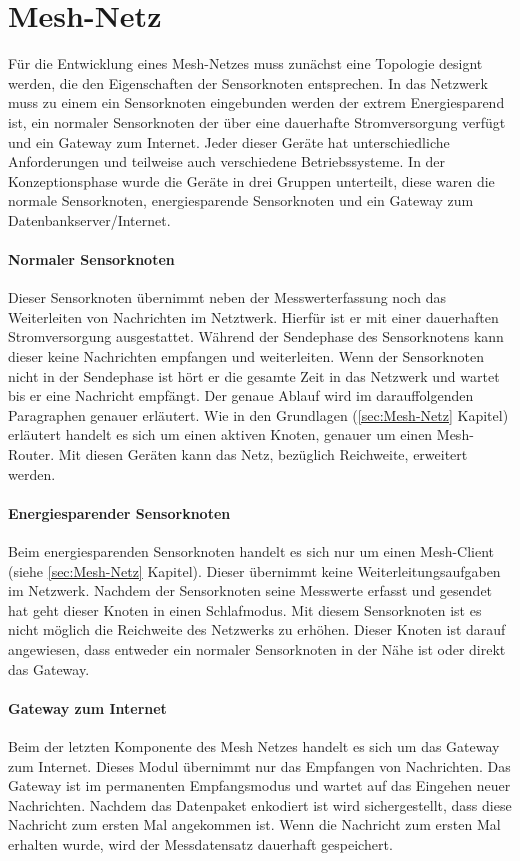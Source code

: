 \section{Mesh-Netz}
\label{sec:KonzeptionMeshNetz}
Für die Entwicklung eines Mesh-Netzes muss zunächst eine Topologie designt werden, die den Eigenschaften der Sensorknoten entsprechen. In das Netzwerk muss zu einem ein Sensorknoten eingebunden werden der extrem Energiesparend ist, ein normaler Sensorknoten der über eine dauerhafte Stromversorgung verfügt und ein Gateway zum Internet. Jeder dieser Geräte hat unterschiedliche Anforderungen und teilweise auch verschiedene Betriebssysteme. 
In der Konzeptionsphase wurde die Geräte in drei Gruppen unterteilt, diese waren die normale Sensorknoten, energiesparende Sensorknoten und ein Gateway zum Datenbankserver/Internet.
\paragraph{Normaler Sensorknoten} Dieser Sensorknoten übernimmt neben der Messwerterfassung noch das Weiterleiten von Nachrichten im Netztwerk. Hierfür ist er mit einer dauerhaften Stromversorgung ausgestattet. Während der Sendephase des Sensorknotens kann dieser keine Nachrichten empfangen und weiterleiten. Wenn der Sensorknoten nicht in der Sendephase ist hört er die gesamte Zeit in das Netzwerk und wartet bis er eine Nachricht empfängt. Der genaue Ablauf wird im darauffolgenden Paragraphen genauer erläutert. Wie in den Grundlagen (\ref{sec:Mesh-Netz} Kapitel) erläutert handelt es sich um einen aktiven Knoten, genauer um einen Mesh-Router. Mit diesen Geräten kann das Netz, bezüglich Reichweite, erweitert werden.
\paragraph{Energiesparender Sensorknoten} Beim energiesparenden Sensorknoten handelt es sich nur um einen Mesh-Client (siehe \ref{sec:Mesh-Netz} Kapitel). Dieser übernimmt keine Weiterleitungsaufgaben im Netzwerk. Nachdem der Sensorknoten seine Messwerte erfasst und gesendet hat geht dieser Knoten in einen Schlafmodus. Mit diesem Sensorknoten ist es nicht möglich die Reichweite des Netzwerks zu erhöhen. Dieser Knoten ist darauf angewiesen, dass entweder ein normaler Sensorknoten in der Nähe ist oder direkt das Gateway.
\paragraph{Gateway zum Internet} Beim der letzten Komponente des Mesh Netzes handelt es sich um das Gateway zum Internet. Dieses Modul übernimmt nur das Empfangen von Nachrichten. Das Gateway ist im permanenten Empfangsmodus und wartet auf das Eingehen neuer Nachrichten. Nachdem das Datenpaket enkodiert ist wird sichergestellt, dass diese Nachricht zum ersten Mal angekommen ist. Wenn die Nachricht zum ersten Mal erhalten wurde, wird der Messdatensatz dauerhaft gespeichert. 

